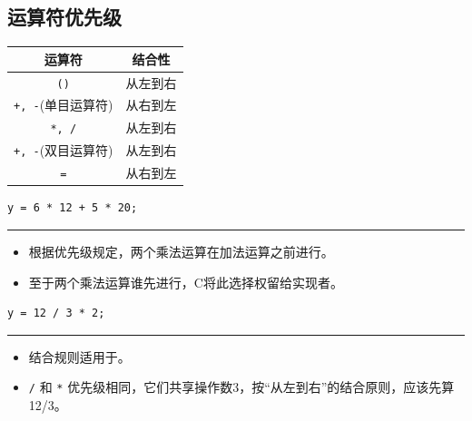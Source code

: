 \subsection{运算符优先级}
\begin{frame}[fragile]\ft{\subsecname}
\begin{table}
\centering
\begin{tabular}{c|c} \hline
运算符& 结合性\\\hline\hline
\lstinline|()| & 从左到右 \\\hline
\lstinline|+, -|(单目运算符) & 从右到左\\\hline
\lstinline|*, /| & 从左到右 \\\hline
\lstinline|+, -|(双目运算符) & 从左到右 \\\hline
\lstinline|=| & 从右到左\\\hline
\end{tabular}
\end{table}
\end{frame}


\begin{frame}[fragile]\ft{\subsecname}
\begin{lstlisting}[frame=no,backgroundcolor=\color{red!10}]
y = 6 * 12 + 5 * 20;
\end{lstlisting}

\rule{\textwidth}{1mm}\pause 

\begin{itemize}
\item 根据优先级规定，两个乘法运算在加法运算之前进行。\\[0.1in]
\item 至于两个乘法运算谁先进行，C将此选择权留给实现者。
\end{itemize}

\end{frame}

\begin{frame}[fragile]\ft{\subsecname}
\begin{lstlisting}[frame=no,backgroundcolor=\color{red!10}]
y = 12 / 3 * 2;
\end{lstlisting}
\rule{\textwidth}{1mm}\pause 

\begin{itemize}
\item 结合规则适用于。\\[0.1in]
\item  \lstinline|/| 和 \lstinline|*| 优先级相同，它们共享操作数3，按“从左到右”的结合原则，应该先算12/3。
\end{itemize}
\end{frame}

